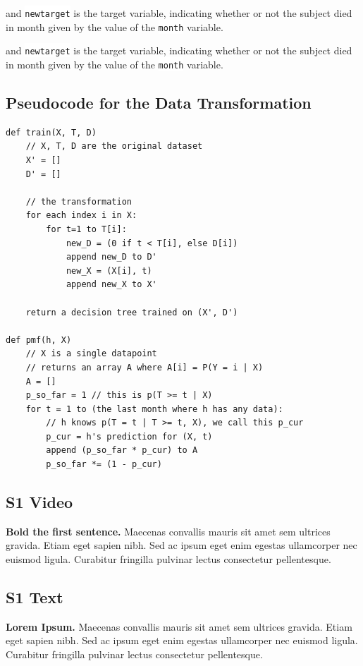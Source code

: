 \documentclass[10pt,letterpaper]{article}
\newcommand{\codewhite}[1]{\colorbox{white}{\texttt{#1}}}
\begin{document}
and 
\codewhite{newtarget} is the target variable, indicating whether or not the subject died in month given by the value of the \codewhite{month} variable.




and 
\codewhite{newtarget} is the target variable, indicating whether or not the subject died in month given by the value of the \codewhite{month} variable.


\subsection*{Pseudocode for the Data Transformation}
\label{subsec:pseudocode}

\begin{verbatim}
def train(X, T, D)
    // X, T, D are the original dataset
    X' = []
    D' = []

    // the transformation
    for each index i in X:
        for t=1 to T[i]:
            new_D = (0 if t < T[i], else D[i])
            append new_D to D'
            new_X = (X[i], t)
            append new_X to X'

    return a decision tree trained on (X', D')

def pmf(h, X)
    // X is a single datapoint
    // returns an array A where A[i] = P(Y = i | X)
    A = []
    p_so_far = 1 // this is p(T >= t | X)
    for t = 1 to (the last month where h has any data):
        // h knows p(T = t | T >= t, X), we call this p_cur
        p_cur = h's prediction for (X, t)
        append (p_so_far * p_cur) to A
        p_so_far *= (1 - p_cur)

\end{verbatim}



\subsection*{S1 Video}
\label{S1_Video}
{\bf Bold the first sentence.}  Maecenas convallis mauris sit amet sem ultrices gravida. Etiam eget sapien nibh. Sed ac ipsum eget enim egestas ullamcorper nec euismod ligula. Curabitur fringilla pulvinar lectus consectetur pellentesque.

\subsection*{S1 Text}
\label{S1_Text}
{\bf Lorem Ipsum.} Maecenas convallis mauris sit amet sem ultrices gravida. Etiam eget sapien nibh. Sed ac ipsum eget enim egestas ullamcorper nec euismod ligula. Curabitur fringilla pulvinar lectus consectetur pellentesque.
\end{document}
